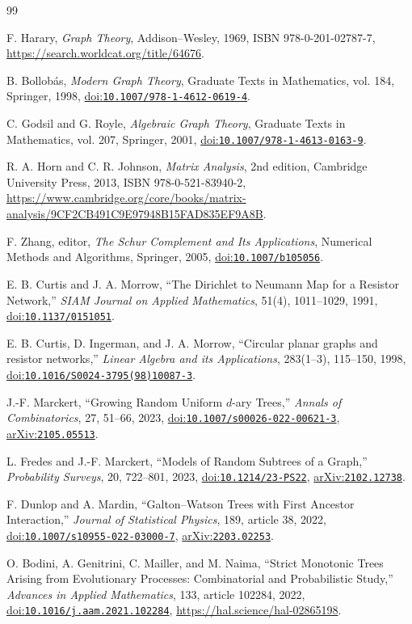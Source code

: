 \documentclass[11pt]{article}
\theoremstyle{remark}
\newcommand{\doi}[1]{\href{https://doi.org/#1}{doi:\nolinkurl{#1}}}
\newcommand{\arxivref}[1]{\href{https://arxiv.org/abs/#1}{arXiv:\nolinkurl{#1}}}
\numberwithin{equation}{section}
\begin{document}
\begin{thebibliography}{99}

F. Harary,
\emph{Graph Theory},
Addison--Wesley, 1969,
ISBN 978-0-201-02787-7,
\url{https://search.worldcat.org/title/64676}.

B. Bollob{\'a}s,
\emph{Modern Graph Theory},
Graduate Texts in Mathematics, vol. 184,
Springer, 1998,
\doi{10.1007/978-1-4612-0619-4}.

C. Godsil and G. Royle,
\emph{Algebraic Graph Theory},
Graduate Texts in Mathematics, vol. 207,
Springer, 2001,
\doi{10.1007/978-1-4613-0163-9}.

R. A. Horn and C. R. Johnson,
\emph{Matrix Analysis},
2nd edition,
Cambridge University Press, 2013,
ISBN 978-0-521-83940-2,
\url{https://www.cambridge.org/core/books/matrix-analysis/9CF2CB491C9E97948B15FAD835EF9A8B}.

F. Zhang, editor,
\emph{The Schur Complement and Its Applications},
Numerical Methods and Algorithms,
Springer, 2005,
\doi{10.1007/b105056}.

E. B. Curtis and J. A. Morrow,
``The Dirichlet to Neumann Map for a Resistor Network,''
\emph{SIAM Journal on Applied Mathematics},
51(4), 1011--1029, 1991,
\doi{10.1137/0151051}.

E. B. Curtis, D. Ingerman, and J. A. Morrow,
``Circular planar graphs and resistor networks,''
\emph{Linear Algebra and its Applications},
283(1--3), 115--150, 1998,
\doi{10.1016/S0024-3795(98)10087-3}.

J.-F. Marckert,
``Growing Random Uniform $d$-ary Trees,''
\emph{Annals of Combinatorics},
27, 51--66, 2023,
\doi{10.1007/s00026-022-00621-3},
\arxivref{2105.05513}.

L. Fredes and J.-F. Marckert,
``Models of Random Subtrees of a Graph,''
\emph{Probability Surveys},
20, 722--801, 2023,
\doi{10.1214/23-PS22},
\arxivref{2102.12738}.

F. Dunlop and A. Mardin,
``Galton--Watson Trees with First Ancestor Interaction,''
\emph{Journal of Statistical Physics},
189, article 38, 2022,
\doi{10.1007/s10955-022-03000-7},
\arxivref{2203.02253}.

O. Bodini, A. Genitrini, C. Mailler, and M. Naima,
``Strict Monotonic Trees Arising from Evolutionary Processes: Combinatorial and Probabilistic Study,''
\emph{Advances in Applied Mathematics},
133, article 102284, 2022,
\doi{10.1016/j.aam.2021.102284},
\url{https://hal.science/hal-02865198}.


\end{thebibliography}
\end{document}
